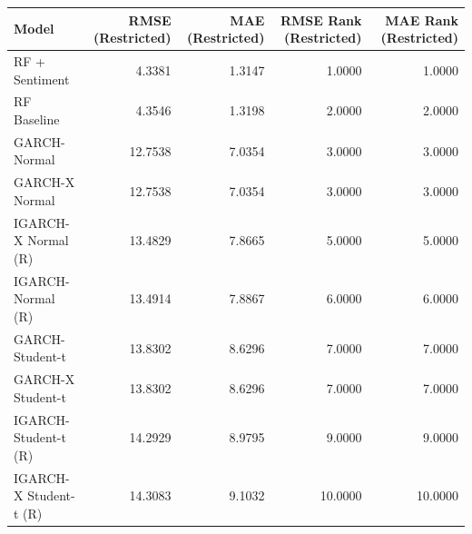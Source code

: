 \begin{tabular}{lrrrr}
\toprule
Model & RMSE (Restricted) & MAE (Restricted) & RMSE Rank (Restricted) & MAE Rank (Restricted) \\
\midrule
RF + Sentiment & 4.3381 & 1.3147 & 1.0000 & 1.0000 \\
RF Baseline & 4.3546 & 1.3198 & 2.0000 & 2.0000 \\
GARCH-Normal & 12.7538 & 7.0354 & 3.0000 & 3.0000 \\
GARCH-X Normal & 12.7538 & 7.0354 & 3.0000 & 3.0000 \\
IGARCH-X Normal (R) & 13.4829 & 7.8665 & 5.0000 & 5.0000 \\
IGARCH-Normal (R) & 13.4914 & 7.8867 & 6.0000 & 6.0000 \\
GARCH-Student-t & 13.8302 & 8.6296 & 7.0000 & 7.0000 \\
GARCH-X Student-t & 13.8302 & 8.6296 & 7.0000 & 7.0000 \\
IGARCH-Student-t (R) & 14.2929 & 8.9795 & 9.0000 & 9.0000 \\
IGARCH-X Student-t (R) & 14.3083 & 9.1032 & 10.0000 & 10.0000 \\
\bottomrule
\end{tabular}
